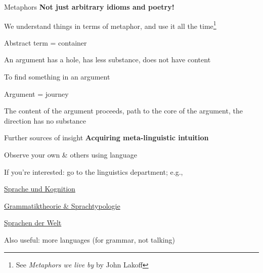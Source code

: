 \documentclass[aspectratio=169,cramped]{beamer}
\let\tempone\itemize
\let\temptwo\enditemize
\renewenvironment{itemize}{\tempone\addtolength{\itemsep}{-0\baselineskip}\addtolength{\parskip}{-0.2\baselineskip}}{\temptwo}
\newcommand{\ex}[1]{{\color{teal} #1}}
\begin{document}
\begin{frame}{Metaphors}
	\textbf{Not just arbitrary idioms and poetry!}
  \begin{itemize}
  \item We understand things in terms of metaphor, and use it all the time\footnote{See
      \textit{Metaphors we live by} by John Lakoff}
  \item Abstract term = container
    \begin{itemize}
    \item \ex{An argument has a hole, has less substance, does not have content}
    \item \ex{To find something in an argument}
    \end{itemize}
  \item Argument = journey
    \begin{itemize}
    \item \ex{The content of the argument proceeds, path to the core of the argument, the direction
        has no substance}
    \end{itemize}
  \end{itemize}
\end{frame}


\begin{frame}{Further sources of insight}
  \textbf{Acquiring meta-linguistic intuition}
  \begin{itemize}
  \item Observe your own \& others using language
    \item If you're interested: go to the linguistics department; e.g.,
    \begin{itemize}
    \item
      \href{https://online.uni-graz.at/kfu_online/wbLv.wbShowLVDetail?pStpSpNr=584778}{Sprache und
        Kognition}
    \item 
      \href{https://online.uni-graz.at/kfu_online/wbLv.wbShowLVDetail?pStpSpNr=565792}{Grammatiktheorie
        \& Sprachtypologie}
    \item
      \href{https://online.uni-graz.at/kfu_online/wbLv.wbShowLVDetail?pStpSpNr=582944&pSpracheNr=1}{Sprachen
        der Welt}
    \end{itemize}
  \item Also useful: more languages (for grammar, not talking)
  \end{itemize}
\end{frame}

\end{document}

